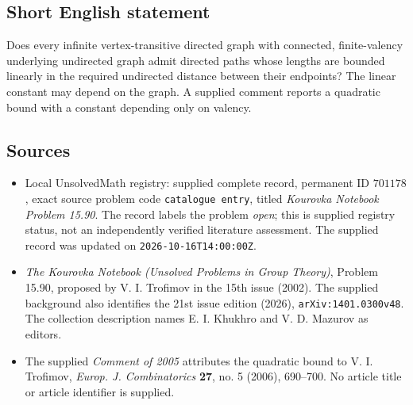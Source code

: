 \documentclass[11pt]{article}
\begin{document}
\subsection{Short English statement}
Does every infinite vertex-transitive directed graph with connected, finite-valency underlying undirected graph admit directed paths whose lengths are bounded linearly in the required undirected distance between their endpoints? The linear constant may depend on the graph. A supplied comment reports a quadratic bound with a constant depending only on valency.
\subsection{Sources}
\begin{itemize}
\item Local UnsolvedMath registry: supplied complete record, permanent ID \(701178\), exact source problem code \texttt{catalogue entry}, titled \emph{Kourovka Notebook Problem 15.90}. The record labels the problem \emph{open}; this is supplied registry status, not an independently verified literature assessment. The supplied record was updated on \texttt{2026-10-16T14:00:00Z}.
\item \emph{The Kourovka Notebook (Unsolved Problems in Group Theory)}, Problem 15.90, proposed by V. I. Trofimov in the 15th issue (2002). The supplied background also identifies the 21st issue edition (2026), \texttt{arXiv:1401.0300v48}. The collection description names E. I. Khukhro and V. D. Mazurov as editors.
\item The supplied \emph{Comment of 2005} attributes the quadratic bound to V. I. Trofimov, \emph{Europ. J. Combinatorics} \textbf{27}, no. 5 (2006), 690--700. No article title or article identifier is supplied.
\end{itemize}
\end{document}
